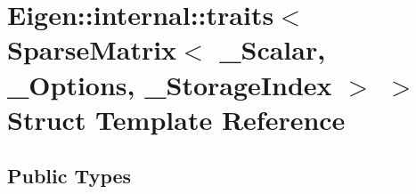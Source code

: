 \hypertarget{struct_eigen_1_1internal_1_1traits_3_01_sparse_matrix_3_01___scalar_00_01___options_00_01___storage_index_01_4_01_4}{}\section{Eigen\+:\+:internal\+:\+:traits$<$ Sparse\+Matrix$<$ \+\_\+\+Scalar, \+\_\+\+Options, \+\_\+\+Storage\+Index $>$ $>$ Struct Template Reference}
\label{struct_eigen_1_1internal_1_1traits_3_01_sparse_matrix_3_01___scalar_00_01___options_00_01___storage_index_01_4_01_4}
\subsection*{Public Types}
